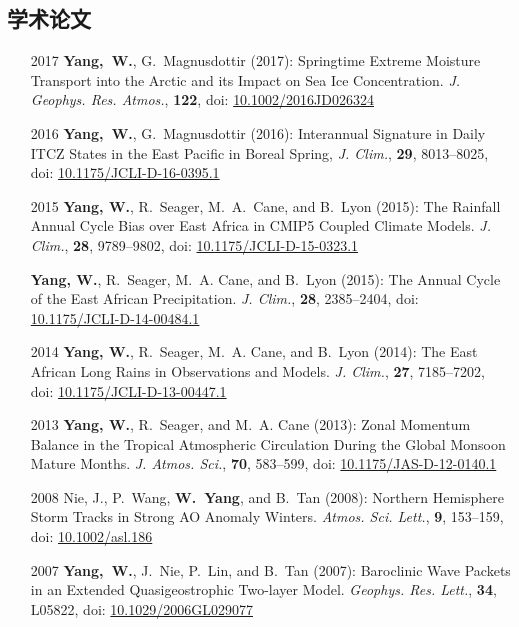 \documentclass[11pt]{article}
\newcommand{\doi}[1]{ doi: \href{https://doi.org/#1}{#1} }
\begin{document}
\begin{CJK*}{UTF8}{gkai}
\section{学术论文}
\begin{itemize}[leftmargin=10ex,label={}, itemsep=1ex]
    \item[2017] \textbf{Yang,~W.}, G.~Magnusdottir (2017): Springtime Extreme Moisture Transport into the Arctic and its Impact on Sea Ice Concentration. \emph{J. Geophys. Res. Atmos.}, \textbf{122}, \doi{10.1002/2016JD026324}
    
	\item[2016] \textbf{Yang,~W.}, G.~Magnusdottir (2016): Interannual Signature in Daily ITCZ States in the East Pacific in Boreal Spring, \newblock \emph{J. Clim.},  \textbf{29}, 8013--8025, \doi{10.1175/JCLI-D-16-0395.1}
	
	\item[2015] \textbf{Yang, W.}, R.~Seager, M.~A.~Cane, and B.~Lyon (2015): The Rainfall Annual Cycle Bias over East Africa in CMIP5 Coupled Climate Models.
\newblock \emph{J. Clim.}, \textbf{28}, 9789--9802, \doi{10.1175/JCLI-D-15-0323.1}

	\item[] \textbf{Yang, W.}, R.~Seager, M.~A. Cane, and B.~Lyon (2015): The Annual Cycle of the
  East African Precipitation.
\newblock \emph{J. Clim.}, \textbf{28}, 2385--2404, \doi {10.1175/JCLI-D-14-00484.1}

	\item[2014] \textbf{Yang, W.}, R.~Seager, M.~A. Cane, and B.~Lyon (2014): The East African Long
  Rains in Observations and Models.
\newblock \emph{J. Clim.}, \textbf{27}, 7185--7202, \doi{10.1175/JCLI-D-13-00447.1}

	\item[2013] \textbf{Yang, W.}, R.~Seager, and M.~A. Cane (2013): Zonal Momentum Balance in the
  Tropical Atmospheric Circulation During the Global Monsoon Mature Months.
\newblock \emph{J. Atmos. Sci.}, \textbf{70}, 583--599, \doi{10.1175/JAS-D-12-0140.1}

	\item[2008] Nie, J., P.~Wang, \textbf{W.~Yang}, and B.~Tan (2008): Northern Hemisphere Storm Tracks
  in Strong AO Anomaly Winters.
\newblock \emph{Atmos. Sci. Lett.}, \textbf{9}, 153--159, \doi{10.1002/asl.186}

	\item[2007] \textbf{Yang,~W.}, J.~Nie, P.~Lin, and B.~Tan (2007): Baroclinic Wave Packets in an
  Extended Quasigeostrophic Two-layer Model.  \emph{Geophys. Res. Lett.}, \textbf{34}, L05822,  \doi{10.1029/2006GL029077}


\end{itemize}
\end{CJK*}
\end{document}
